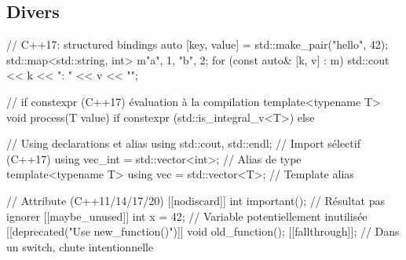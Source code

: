 \documentclass{article}
\begin{document}
\begin{multicols*}{4}
\section*{Divers}

\begin{cppcode}
// C++17: structured bindings
auto [key, value] = std::make_pair("hello", 42);
std::map<std::string, int> m{{"a", 1}, {"b", 2}};
for (const auto& [k, v] : m) {
    std::cout << k << ": " << v << "\n";
}

// if constexpr (C++17) évaluation à la compilation
template<typename T>
void process(T value) {
    if constexpr (std::is_integral_v<T>) {} else {} }

// Using declarations et alias
using std::cout, std::endl; // Import sélectif (C++17)
using vec_int = std::vector<int>; // Alias de type
template<typename T>
using vec = std::vector<T>; // Template alias

// Attribute (C++11/14/17/20)
[[nodiscard]] int important(); // Résultat pas ignorer
[[maybe_unused]] int x = 42;   // Variable potentiellement inutilisée
[[deprecated("Use new_function()")]] void old_function();
[[fallthrough]]; // Dans un switch, chute intentionnelle
\end{cppcode}









\end{multicols*}
\end{document}
